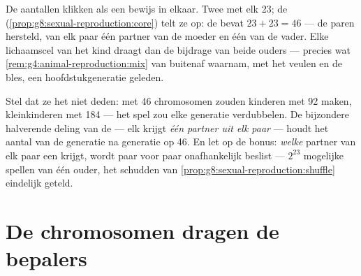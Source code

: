 \begin{example}\label{ex:g9:chromosomes:arithmetic}
De aantallen klikken als een bewijs in elkaar. Twee
 met elk 23; de 
(\cref{prop:g8:sexual-reproduction:core}) telt ze op: de 
bevat $23 + 23 = 46$ --- de paren hersteld, van elk paar één
partner van de moeder en één van de vader. Elke lichaamscel van
het kind draagt dan de bijdrage van beide ouders --- precies wat
\cref{rem:g4:animal-reproduction:mix} van buitenaf waarnam, met
het veulen en de bles, een hoofdstukgeneratie geleden.
\end{example}

\begin{remark}\label{rem:g9:chromosomes:whyhalve}
Stel dat ze het niet deden:  met 46 chromosomen
zouden kinderen met 92 maken, kleinkinderen met 184 --- het
spel zou elke generatie verdubbelen. De bijzondere halverende
deling van de  --- elk krijgt \emph{één partner
uit elk paar} --- houdt het aantal van de  generatie na
generatie op 46. En let op de bonus: \emph{welke} partner van
elk paar een  krijgt, wordt paar voor paar
onafhankelijk beslist --- $2^{23}$ mogelijke spellen van één
ouder, het schudden van
\cref{prop:g8:sexual-reproduction:shuffle} eindelijk geteld.
\end{remark}

\section{De chromosomen dragen de bepalers}


